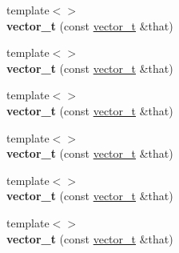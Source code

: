 \begin{DoxyCompactItemize}
{\footnotesize template$<$$>$ }\\{\bfseries vector\+\_\+t} (const \hyperlink{classatom_1_1vector__t}{vector\+\_\+t} \&that)
\item 
\mbox{\label{classatom_1_1vector__t_a649807aa460fde380cc32afd3d8b1ad1}} 
{\footnotesize template$<$$>$ }\\{\bfseries vector\+\_\+t} (const \hyperlink{classatom_1_1vector__t}{vector\+\_\+t} \&that)
\item 
\mbox{\label{classatom_1_1vector__t_a3926bd28d9077d0d5d7da62755f36de0}} 
{\footnotesize template$<$$>$ }\\{\bfseries vector\+\_\+t} (const \hyperlink{classatom_1_1vector__t}{vector\+\_\+t} \&that)
\item 
\mbox{\label{classatom_1_1vector__t_ab22fdb73b3f78a0066e8b8f4caccb318}} 
{\footnotesize template$<$$>$ }\\{\bfseries vector\+\_\+t} (const \hyperlink{classatom_1_1vector__t}{vector\+\_\+t} \&that)
\item 
\mbox{\label{classatom_1_1vector__t_a53279ae55339ea6d6c90e40a42ef9401}} 
{\footnotesize template$<$$>$ }\\{\bfseries vector\+\_\+t} (const \hyperlink{classatom_1_1vector__t}{vector\+\_\+t} \&that)
\item 
\mbox{\label{classatom_1_1vector__t_a02bd68eadc121f10fad608f2e8ac7e76}} 
{\footnotesize template$<$$>$ }\\{\bfseries vector\+\_\+t} (const \hyperlink{classatom_1_1vector__t}{vector\+\_\+t} \&that)
\end{DoxyCompactItemize}
